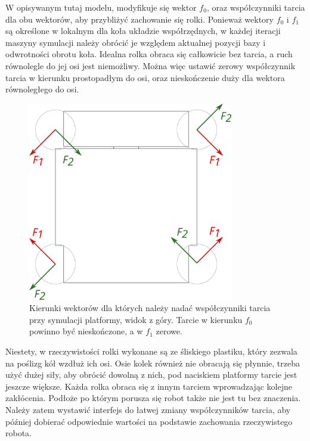 		W opisywanym tutaj modelu, modyfikuje się wektor $f_0$, oraz współczynniki tarcia dla obu wektorów, aby przybliżyć zachowanie się rolki.
		Ponieważ wektory $f_0$ i $f_1$ są określone w lokalnym dla koła układzie współrzędnych, 
		w każdej iteracji maszyny symulacji należy obrócić je względem aktualnej pozycji bazy i odwrotności obrotu koła.
		Idealna rolka obraca się całkowicie bez tarcia, a ruch równolegle do jej osi jest niemożliwy.
		Można więc ustawić zerowy współczynnik tarcia w kierunku prostopadłym do osi, oraz nieskończenie duży dla wektora równoległego do osi.

		\begin{figure}[H]
		\centering
		\includegraphics[width=0.8\textwidth]{graphics/base_vects.pdf}
		\caption{Kierunki wektorów dla których należy nadać współczynniki tarcia przy symulacji platformy, widok z góry. Tarcie w kierunku $f_0$ powinno być nieskończone, a w $f_1$ zerowe.}
		\end{figure} 

		Niestety, w rzeczywistości rolki wykonane są ze śliskiego plastiku, który zezwala na poślizg kół wzdłuż ich osi.
		Osie kolek również nie obracają się płynnie, trzeba użyć dużej siły, aby obrócić dowolną z nich, pod naciskiem platformy tarcie jest jeszcze większe.
		Każda rolka obraca się z innym tarciem wprowadzając kolejne zakłócenia.
		Podłoże po którym porusza się robot także nie jest tu bez znaczenia.
		Należy zatem wystawić interfejs do łatwej zmiany współczynników tarcia, aby później dobierać odpowiednie wartości na podstawie zachowania rzeczywistego robota.

